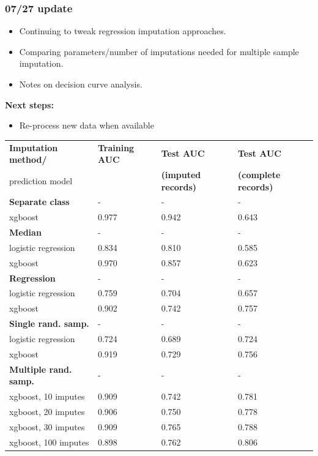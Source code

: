\documentclass[12pt]{article}
\begin{document}
\pagebreak

\subsubsection*{07/27 update}

\begin{itemize}
  \item Continuing to tweak regression imputation approaches.
  \item Comparing parameters/number of imputations needed for multiple sample imputation.
  \item Notes on decision curve analysis.
\end{itemize}

\textbf{Next steps:}
\begin{itemize}
  \item Re-process new data when available%
\end{itemize}

\begin{center}
\begin{tabular}{|l|l|l|l|}
\hline
\textbf{Imputation method/} & \textbf{Training AUC} & \textbf{Test AUC} & \textbf{Test AUC} \\
prediction model& & \textbf{(imputed records)} & \textbf{(complete records)} \\ \hline
{\bf Separate class} & - & - & - \\ \hline
xgboost & 0.977 & 0.942 & 0.643 \\ \hline
{\bf Median} & - & - & - \\ \hline
logistic regression & 0.834 & 0.810 & 0.585 \\ \hline
xgboost & 0.970 & 0.857 & 0.623 \\ \hline
{\bf Regression} & - & - & - \\ \hline
logistic regression & 0.759 & 0.704 & 0.657 \\ \hline
xgboost & 0.902 & 0.742 & 0.757 \\ \hline %
{\bf Single rand. samp.} & - & - & - \\ \hline
logistic regression & 0.724 & 0.689 & 0.724 \\ \hline
xgboost & 0.919 & 0.729 & 0.756 \\ \hline
{\bf Multiple rand. samp.} & - & - & - \\ \hline
xgboost, 10 imputes & 0.909 & 0.742 & 0.781 \\ \hline
xgboost, 20 imputes & 0.906 & 0.750 & 0.778 \\ \hline
xgboost, 30 imputes & 0.909 & 0.765 & 0.788 \\ \hline
xgboost, 100 imputes & 0.898 & 0.762 & 0.806 \\ \hline %
\end{tabular}
\end{center}
\end{document}
